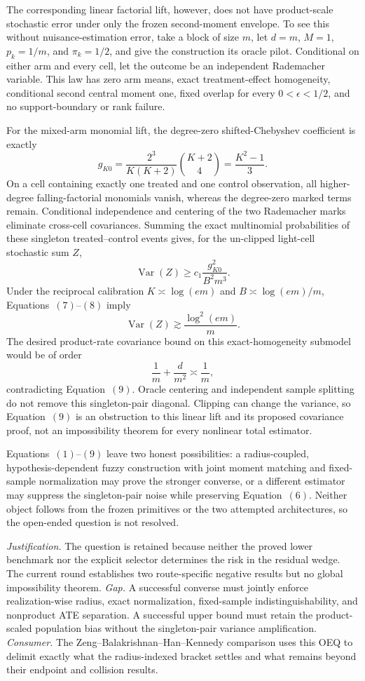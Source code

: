 \documentclass{article}
\begin{document}
The corresponding linear factorial lift, however, does not have product-scale stochastic error under only the frozen second-moment envelope.  To see this without nuisance-estimation error, take a block of size \(m\), let \(d=m\), \(M=1\), \(p_k=1/m\), and \(\pi_k=1/2\), and give the construction its oracle pilot.  Conditional on either arm and every cell, let the outcome be an independent Rademacher variable.  This law has zero arm means, exact treatment-effect homogeneity, conditional second central moment one, fixed overlap for every \(0<\epsilon<1/2\), and no support-boundary or rank failure.

For the mixed-arm monomial lift, the degree-zero shifted-Chebyshev coefficient is exactly
\[
 g_{K0}
 =\frac{2^3}{K(K+2)}\binom{K+2}{4}
 =\frac{K^2-1}{3}.
\tag{7}
\]
On a cell containing exactly one treated and one control observation, all higher-degree falling-factorial monomials vanish, whereas the degree-zero marked terms remain.  Conditional independence and centering of the two Rademacher marks eliminate cross-cell covariances.  Summing the exact multinomial probabilities of these singleton treated--control events gives, for the un-clipped light-cell stochastic sum \(Z\),
\[
 \operatorname{Var}(Z)
 \ge c_1\frac{g_{K0}^2}{B^2m^3}.
\tag{8}
\]
Under the reciprocal calibration \(K\asymp\log(em)\) and \(B\asymp\log(em)/m\), Equations~\((7)\)--\((8)\) imply
\[
 \operatorname{Var}(Z)
 \gtrsim \frac{\log^2(em)}m.
\tag{9}
\]
The desired product-rate covariance bound on this exact-homogeneity submodel would be of order
\[
 \frac1m+\frac d{m^2}\asymp\frac1m,
\]
contradicting Equation~\((9)\).  Oracle centering and independent sample splitting do not remove this singleton-pair diagonal.  Clipping can change the variance, so Equation~\((9)\) is an obstruction to this linear lift and its proposed covariance proof, not an impossibility theorem for every nonlinear total estimator.

Equations~\((1)\)--\((9)\) leave two honest possibilities: a radius-coupled, hypothesis-dependent fuzzy construction with joint moment matching and fixed-sample normalization may prove the stronger converse, or a different estimator may suppress the singleton-pair noise while preserving Equation~\((6)\).  Neither object follows from the frozen primitives or the two attempted architectures, so the open-ended question is not resolved.
\par\smallskip\noindent \textit{Justification.} The question is retained because neither the proved lower benchmark nor the explicit selector determines the risk in the residual wedge. The current round establishes two route-specific negative results but no global impossibility theorem. \textit{Gap.} A successful converse must jointly enforce realization-wise radius, exact normalization, fixed-sample indistinguishability, and nonproduct ATE separation. A successful upper bound must retain the product-scaled population bias without the singleton-pair variance amplification. \textit{Consumer.} The Zeng--Balakrishnan--Han--Kennedy comparison uses this OEQ to delimit exactly what the radius-indexed bracket settles and what remains beyond their endpoint and collision results.
\end{document}
